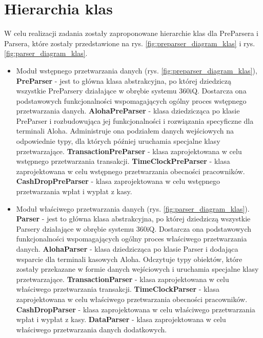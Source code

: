 \documentclass[a4paper]{book}
\begin{document}
\section{Hierarchia klas}
W celu realizacji zadania zostały zaproponowane hierarchie klas dla PreParsera i Parsera, które zostały przedstawione na rys. \ref{fig:preparser_diagram_klas} i  rys. \ref{fig:parser_diagram_klas}. 
\begin{itemize}
	\setlength\itemsep{0.1pt}
	\item Moduł wstępnego przetwarzania danych (rys. \ref{fig:preparser_diagram_klas}),
	\subitem \textbf{PreParser} - jest to główna klasa abstrakcyjna, po której dziedziczą wszystkie PreParsery działające w obrębie systemu 360iQ. Dostarcza ona podstawowych funkcjonalności wspomagających ogólny proces wstępnego przetwarzania danych.
	\subitem \textbf{AlohaPreParser} - klasa dziedzicząca po klasie PreParser i rozbudowująca jej funkcjonalności i rozwiązania specyficzne dla terminali Aloha. Administruje ona podziałem danych wejściowych na odpowiednie typy, dla których później uruchamia specjalne klasy przetwarzające.
	\subitem \textbf{TransactionPreParser} - klasa zaprojektowana w celu wstępnego przetwarzania transakcji.
	\subitem \textbf{TimeClockPreParser} - klasa zaprojektowana w celu wstępnego przetwarzania obecności pracowników.
	\subitem \textbf{CashDropPreParser} - klasa zaprojektowana w celu wstępnego przetwarzania wpłat i wypłat z kasy.
	\item Moduł właściwego przetwarzania danych (rys. \ref{fig:parser_diagram_klas}).
	\subitem \textbf{Parser} - jest to główna klasa abstrakcyjna, po której dziedziczą wszystkie Parsery działające w obrębie systemu 360iQ. Dostarcza ona podstawowych funkcjonalności wspomagających ogólny proces właściwego przetwarzania danych.
	\subitem \textbf{AlohaParser} - klasa dziedzicząca po klasie Parser i dodająca wsparcie dla terminali kasowych Aloha. Odczytuje typy obiektów, które zostały przekazane w formie danych wejściowych i uruchamia specjalne klasy przetwarzające.
	\subitem \textbf{TransactionParser} - klasa zaprojektowana w celu właściwego przetwarzania transakcji.
	\subitem \textbf{TimeClockParser} - klasa zaprojektowana w celu właściwego przetwarzania obecności pracowników.
	\subitem \textbf{CashDropParser} - klasa zaprojektowana w celu właściwego przetwarzania wpłat i wypłat z kasy.
	\subitem \textbf{DataParser} - klasa zaprojektowana w celu właściwego przetwarzania danych dodatkowych.
\end{itemize}
\end{document}

